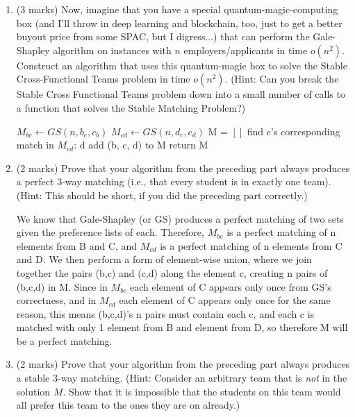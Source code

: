 \documentclass[11pt]{article}
\begin{document}
\begin{enumerate}
\item (3 marks)
Now, imagine that you have a special quantum-magic-computing box (and
I'll throw in deep learning and blockchain, too, just to get a better
buyout price from some SPAC, but I digress...) that can perform the
Gale-Shapley algorithm on instances with $n$ employers/applicants
in time $o(n^2)$.
Construct an algorithm that uses this quantum-magic box to
solve the Stable Cross-Functional Teams problem
in time $o(n^2)$.  (Hint:  Can you break the Stable Cross Functional Teams
problem down into a small number of calls to a function that solves
the Stable Matching Problem?)

\begin{soln}
    \begin{algorithmic}[1]
            \State $M_{bc} \leftarrow GS(n, b_c, c_b)$
             \State $M_{cd} \leftarrow GS(n, d_c, c_d)$
             \State M = $[]$
                \State find c's corresponding match in $M_{cd}$: d
                \State add (b, c, d) to M
             \EndFor
             \State return M
        \EndProcedure
    \end{algorithmic}
\end{soln}

\item (2 marks)
Prove that your algorithm from the preceding part always produces
a perfect 3-way matching (i.e., that every student is in exactly
one team).  (Hint:  This should be short, if you did the preceding part
correctly.)

\begin{soln}
    We know that Gale-Shapley (or GS) produces a perfect matching of two sets given the preference lists of each. Therefore, $M_{bc}$ is a perfect matching of n elements from B and C, and  $M_{cd}$ is a perfect matching of n elements from C and D. We then perform a form of element-wise union, where we join together the pairs (b,c) and (c,d) along the element c, creating n pairs of (b,c,d) in M. Since in $M_{bc}$ each element of C appears only once from GS's correctness, and in $M_{cd}$ each element of C appears only once for the same reason, this means (b,c,d)'s n pairs must contain each c, and each c is matched with only 1 element from B and element from D, so therefore M will be a perfect matching.
\end{soln}

\item (2 marks)
Prove that your algorithm from the preceding part always produces
a stable 3-way matching.  (Hint:  Consider an arbitrary team
that is \textit{not} in the solution $M$.  Show that it is impossible
that the students on this team would all prefer this team to the ones
they are on already.)


\end{enumerate}
\end{document}
